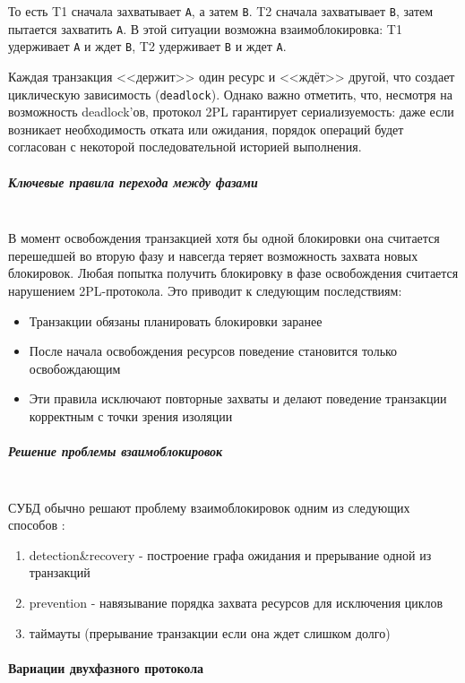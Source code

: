 То есть T1 сначала захватывает \texttt{A}, а затем \texttt{B}. T2 сначала захватывает \texttt{B}, затем пытается захватить \texttt{A}.
В этой ситуации возможна взаимоблокировка: T1 удерживает \texttt{A} и ждет \texttt{B}, T2 удерживает \texttt{B} и ждет \texttt{A}.

Каждая транзакция <<держит>> один ресурс и <<ждёт>> другой, что создает циклическую зависимость (\texttt{deadlock}).
Однако важно отметить, что, несмотря на возможность deadlock'ов, протокол 2PL гарантирует сериализуемость: даже если возникает необходимость отката или ожидания, порядок операций будет согласован с некоторой последовательной историей выполнения.

\subparagraph{Ключевые правила перехода между фазами} ~\\

 В момент освобождения транзакцией хотя бы одной блокировки она считается перешедшей во вторую фазу и навсегда теряет возможность захвата новых блокировок. Любая попытка получить блокировку в фазе освобождения считается нарушением 2PL-протокола.
 Это приводит к следующим последствиям:
 \begin{itemize}
    \item Транзакции обязаны планировать блокировки заранее
    \item После начала освобождения ресурсов поведение становится только освобождающим
    \item Эти правила исключают повторные захваты и делают поведение транзакции корректным с точки зрения изоляции \autocite[ch.22]{ElmasriNavathe}
 \end{itemize}

\subparagraph{Решение проблемы взаимоблокировок} ~\\

 СУБД обычно решают проблему взаимоблокировок одним из следующих способов \autocite{Silberschatz}:
 \begin{enumerate}
    \item detection\&recovery - построение графа ожидания и прерывание одной из транзакций
    \item prevention - навязывание порядка захвата ресурсов для исключения циклов
    \item таймауты (прерывание транзакции если она ждет слишком долго)
 \end{enumerate}

 \paragraph{Вариации двухфазного протокола} ~\\

